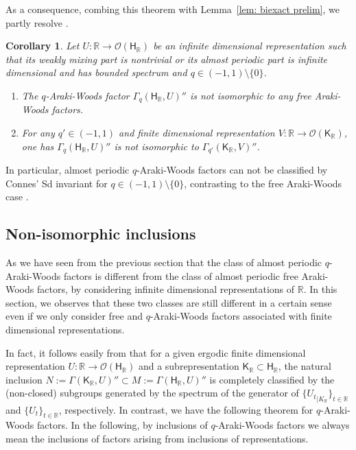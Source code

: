 \documentclass[a4paper,11pt]{amsart}
\newtheorem{cor}[thm]{Corollary}
\theoremstyle{definition}
\newtheorem{rem}[thm]{Remark}
\newcommand{\R}{{\mathbb R}}
\newcommand{\cO}{{\mathcal O}}
\newcommand{\sH}{\mathsf{H}}
\newcommand{\sK}{\mathsf{K}}
\begin{document}
As a consequence, combing this theorem with Lemma~\ref{lem: biexact prelim}, we partly resolve \cite[Conjecture 2.11]{KSW23}.

\begin{cor}
Let $U:\R\to \cO(\sH_\R)$ be an infinite dimensional representation such that its weakly mixing part is nontrivial
	or its almost periodic part is infinite dimensional and has bounded spectrum
	and $q\in (-1,1)\setminus \{0\}$.	
\begin{enumerate}
	\item The $q$-Araki-Woods factor $\Gamma_q(\sH_\R, U)''$ is not isomorphic to any free Araki-Woods factors.
	\item For any $q'\in (-1,1)$ and finite dimensional representation $V: \R\to \cO(\sK_\R)$,
		one has $\Gamma_q(\sH_\R, U)''$ is not isomorphic to $\Gamma_{q'}(\sK_\R, V)''$.
\end{enumerate}
\end{cor}

In particular, almost periodic $q$-Araki-Woods factors can not be classified by Connes' Sd invariant 
	for $q\in (-1,1)\setminus\{0\}$, contrasting to the free Araki-Woods case \cite{Sh97}.



\subsection{Non-isomorphic inclusions}
As we have seen from the previous section that the class of almost periodic $q$-Araki-Woods factors is different from
	the class of almost periodic free Araki-Woods factors,
	by considering infinite dimensional representations of $\R$.
In this section, we observes that these two classes are still different in a certain sense even if we only consider 
	free and $q$-Araki-Woods factors associated with finite dimensional representations.
		
In fact, it follows easily from \cite{Sh97} that for a given ergodic finite dimensional representation $U: \R\to \cO(\sH_\R)$
	and a subrepresentation $\sK_\R\subset \sH_\R$,
	the natural inclusion $N:=\Gamma(\sK_\R, U)''\subset M:=\Gamma(\sH_\R, U)''$ is completely classified by
	the (non-closed) subgroups generated by the spectrum of the generator of $\{{U_t}_{\mid K_\R}\}_{t\in \R}$ and $\{U_t\}_{t\in \R}$, respectively.
In contrast, we have the following theorem for $q$-Araki-Woods factors.
In the following, by inclusions of $q$-Araki-Woods factors we always mean the inclusions of factors
	arising from inclusions of representations.
\end{document}
